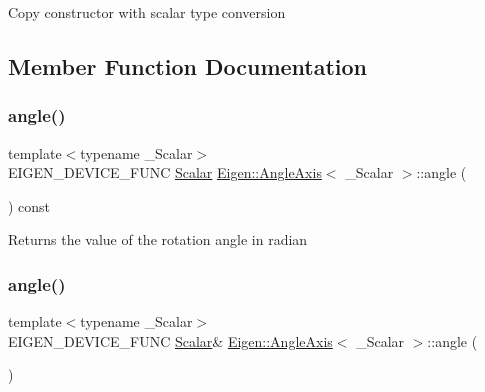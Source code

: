 Copy constructor with scalar type conversion 

\subsection{Member Function Documentation}
\mbox{\label{class_eigen_1_1_angle_axis_a83d3c08a73c111550b7e480d3ed043d4}} 
\subsubsection{\texorpdfstring{angle()}{angle()}\hspace{0.1cm}{\footnotesize\ttfamily [1/2]}}
{\footnotesize\ttfamily template$<$typename \+\_\+\+Scalar$>$ \\
E\+I\+G\+E\+N\+\_\+\+D\+E\+V\+I\+C\+E\+\_\+\+F\+U\+NC \mbox{\hyperlink{class_eigen_1_1_angle_axis_acd9b10692d7d726b28670e4d3a282fe8}{Scalar}} \mbox{\hyperlink{class_eigen_1_1_angle_axis}{Eigen\+::\+Angle\+Axis}}$<$ \+\_\+\+Scalar $>$\+::angle (\begin{DoxyParamCaption}{ }\end{DoxyParamCaption}) const\hspace{0.3cm}{\ttfamily [inline]}}

\begin{DoxyReturn}{Returns}
the value of the rotation angle in radian 
\end{DoxyReturn}
\mbox{\label{class_eigen_1_1_angle_axis_aff92498ed4ede5ce8978ca330efd7c4f}} 
\subsubsection{\texorpdfstring{angle()}{angle()}\hspace{0.1cm}{\footnotesize\ttfamily [2/2]}}
{\footnotesize\ttfamily template$<$typename \+\_\+\+Scalar$>$ \\
E\+I\+G\+E\+N\+\_\+\+D\+E\+V\+I\+C\+E\+\_\+\+F\+U\+NC \mbox{\hyperlink{class_eigen_1_1_angle_axis_acd9b10692d7d726b28670e4d3a282fe8}{Scalar}}\& \mbox{\hyperlink{class_eigen_1_1_angle_axis}{Eigen\+::\+Angle\+Axis}}$<$ \+\_\+\+Scalar $>$\+::angle (\begin{DoxyParamCaption}{ }\end{DoxyParamCaption})\hspace{0.3cm}{\ttfamily [inline]}}

